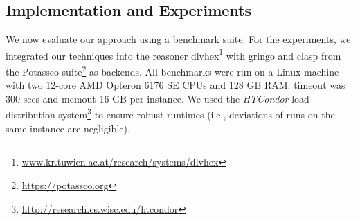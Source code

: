 \documentclass[11pt,fleqn,twoside]{article}
\newcommand\dlvhex{{\small\sffamily dlvhex}\xspace}
\newcommand\clasp{{\small\sffamily clasp}\xspace}
\newcommand\gringo{{\small\sffamily gringo}\xspace}
\begin{document}
		\subsection{Implementation and Experiments}
		\label{sec:hexprogramevaluation:implementation}
		


			We now evaluate our approach using a benchmark suite.
			For the experiments, we integrated our techniques into the reasoner \dlvhex{}\footnote{\url{www.kr.tuwien.ac.at/research/systems/dlvhex}} with
			\gringo{} and \clasp{} from the Potassco suite\footnote{\url{https://potassco.org}} as backends.
			All benchmarks were run
			on a Linux machine with two 12-core AMD
			Opteron 6176 SE CPUs and 128 GB RAM;
			timeout was 300 secs and memout 16 GB per instance.
			We used the \emph{HTCondor} load distribution system\footnote{\url{http://research.cs.wisc.edu/htcondor}}
			to ensure robust runtimes
			(i.e., deviations of runs on the same instance are negligible).
\end{document}
